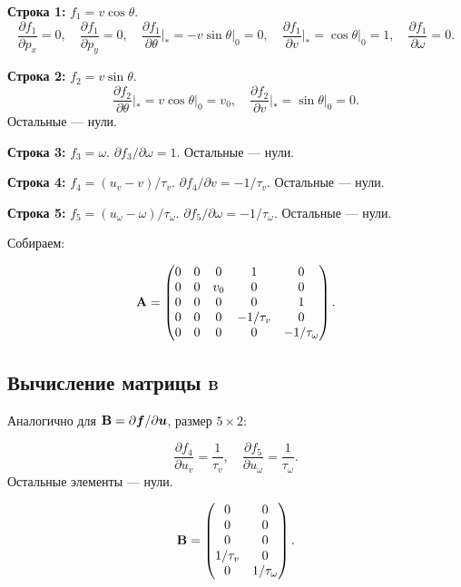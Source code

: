 \textbf{Строка 1:} $f_1 = v\cos\theta$.
\[
  \frac{\partial f_1}{\partial p_x} = 0,
  \quad
  \frac{\partial f_1}{\partial p_y} = 0,
  \quad
  \frac{\partial f_1}{\partial \theta}\bigg|_* = -v\sin\theta\big|_0 = 0,
  \quad
  \frac{\partial f_1}{\partial v}\bigg|_* = \cos\theta\big|_0 = 1,
  \quad
  \frac{\partial f_1}{\partial \omega} = 0.
\]

\textbf{Строка 2:} $f_2 = v\sin\theta$.
\[
  \frac{\partial f_2}{\partial \theta}\bigg|_* = v\cos\theta\big|_0 = v_0,
  \quad
  \frac{\partial f_2}{\partial v}\bigg|_* = \sin\theta\big|_0 = 0.
\]
Остальные --- нули.

\textbf{Строка 3:} $f_3 = \omega$.
$\partial f_3/\partial \omega = 1$. Остальные --- нули.

\textbf{Строка 4:} $f_4 = (u_v - v)/\tau_v$.
$\partial f_4/\partial v = -1/\tau_v$. Остальные --- нули.

\textbf{Строка 5:} $f_5 = (u_\omega - \omega)/\tau_\omega$.
$\partial f_5/\partial \omega = -1/\tau_\omega$. Остальные --- нули.

Собираем:
\begin{formulabox}[title={Матрица $\mat{A}$ (непрерывная)}]
\begin{equation}
  \mathbf{A} = \begin{pmatrix}
    0 & 0 & 0   & 1         & 0          \\
    0 & 0 & v_0 & 0         & 0          \\
    0 & 0 & 0   & 0         & 1          \\
    0 & 0 & 0   & -1/\tau_v & 0          \\
    0 & 0 & 0   & 0         & -1/\tau_\omega
  \end{pmatrix}.
  \label{eq:A_continuous}
\end{equation}
\end{formulabox}

\subsection{Вычисление матрицы $\mat{B}$}

Аналогично для $\mathbf{B} = \partial \bm{f}/\partial \bm{u}$, размер $5 \times 2$:

\[
  \frac{\partial f_4}{\partial u_v} = \frac{1}{\tau_v},
  \quad
  \frac{\partial f_5}{\partial u_\omega} = \frac{1}{\tau_\omega}.
\]
Остальные элементы --- нули.

\begin{formulabox}[title={Матрица $\mat{B}$ (непрерывная)}]
\begin{equation}
  \mathbf{B} = \begin{pmatrix}
    0          & 0              \\
    0          & 0              \\
    0          & 0              \\
    1/\tau_v   & 0              \\
    0          & 1/\tau_\omega
  \end{pmatrix}.
  \label{eq:B_continuous}
\end{equation}
\end{formulabox}

